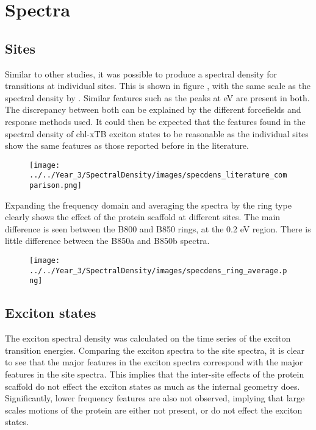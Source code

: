 \section{Spectra}
\label{sec:sites_states_couplings}

\subsection{Sites}
\label{subsec:sites}

Similar to other studies, it was possible to produce a spectral density for \Qy 
transitions at individual sites. This is shown in figure , with the same scale as
the spectral density by . Similar features such as the peaks at eV are present in
both. The discrepancy between both can be explained by the different forcefields
and response methods used. It could then be expected that the features found in
the spectral density of chl-xTB exciton states to be reasonable as the individual
sites show the same features as those reported before in the literature.

\begin{figure}
    \centering
    \texttt{[image: ../../Year\_3/SpectralDensity/images/specdens\_literature\_comparison.png]}
\end{figure}

Expanding the frequency domain and averaging the spectra by the ring type clearly
shows the effect of the protein scaffold at different sites. The main difference
is seen between the B800 and B850 rings, at the 0.2 eV region. There is little difference
between the B850a and B850b spectra.

\begin{figure}
    \texttt{[image: ../../Year\_3/SpectralDensity/images/specdens\_ring\_average.png]}
\end{figure}

\subsection{Exciton states}
\label{subsec:states}

The exciton spectral density was calculated on the time series of the exciton transition
energies. Comparing the exciton spectra to the site spectra, it is clear to see that the major
features in the exciton spectra correspond with the major features in the site spectra.
This implies that the inter-site effects of the protein scaffold do not effect the
exciton states as much as the internal geometry does. Significantly, lower frequency
features are also not observed, implying that large scales motions of the protein
are either not present, or do not effect the exciton states.

